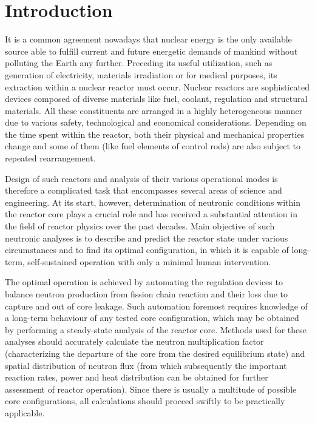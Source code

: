 \chapter{Introduction}\label{chap:intro}
It is a common agreement nowadays that nuclear energy is the only available source able to fulfill current and future
energetic demands of mankind without  polluting the Earth any further. Preceding its useful utilization, such as
generation of electricity, materials irradiation or for medical purposes, its extraction within a nuclear reactor must
occur.
 Nuclear reactors are sophisticated devices composed of diverse materials like fuel, coolant, regulation and structural
 materials. All these constituents are arranged in a highly heterogeneous manner due to various safety, technological
 and economical considerations. Depending on the time spent within the reactor, both their physical and mechanical
 properties change and some of them (like fuel elements of control rods) are also subject to repeated rearrangement.

Design of such reactors and analysis of their various operational modes is therefore a complicated task that encompasses
several areas of science and engineering. At its start, however, determination of neutronic conditions within the
reactor core plays a crucial role and has received a substantial attention in the field of reactor physics over the past
decades. Main objective of such neutronic analyses is to describe and predict the reactor state under various
circumstances and to find its optimal configuration, in which it is capable of long-term, self-sustained operation with
only a minimal human intervention.

The optimal operation is achieved by automating the regulation devices to balance neutron production from fission chain
reaction and their loss due to capture and out of core leakage. Such automation foremost requires knowledge of a
long-term behaviour of any tested core configuration, which may be obtained by performing a steady-state analysis of the
reactor core. Methods used for these analyses should accurately calculate the neutron multiplication factor
(characterizing the departure of the core from the desired equilibrium state) and spatial distribution of neutron flux
(from which subsequently the important reaction rates, power and heat distribution can be obtained for further
assessment of reactor operation). Since there is usually a multitude of possible core configurations, all calculations
should proceed swiftly to be practically applicable.

